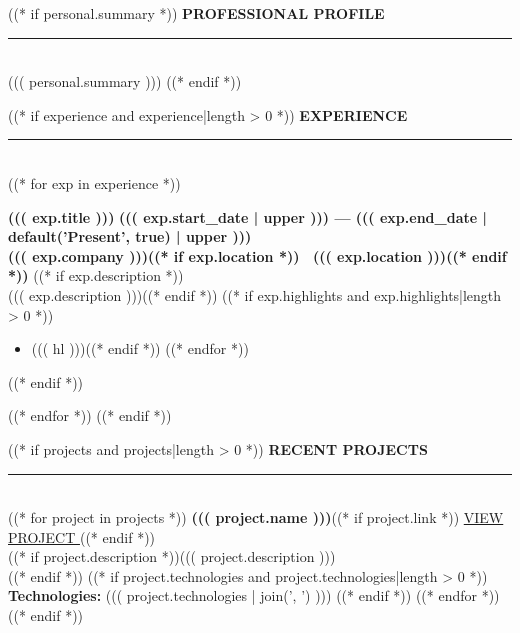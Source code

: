 \documentclass[11pt,a4paper]{article}
\begin{document}
\begin{minipage}[t]{0.62\textwidth}
\color{body}
\vspace{12mm}
\hspace{5mm}
\begin{minipage}[t]{0.88\textwidth}

((* if personal.summary *))
{\fontsize{12}{14}\selectfont\bfseries\color{black}\MakeUppercase{Professional Profile}}\\[2pt]
{\color{black}\rule{\linewidth}{1.5pt}}\\[8pt]
{\fontsize{9.5}{13.5}\selectfont ((( personal.summary )))}
\vspace{15pt}
((* endif *))

((* if experience and experience|length > 0 *))
{\fontsize{12}{14}\selectfont\bfseries\color{black}\MakeUppercase{Experience}}\\[2pt]
{\color{black}\rule{\linewidth}{1.5pt}}\\[10pt]
((* for exp in experience *))
\begin{minipage}{\linewidth}
{\fontsize{10}{12}\selectfont\bfseries ((( exp.title )))} \hfill {\scriptsize\color{muted}\bfseries ((( exp.start_date | upper ))) --- ((( exp.end_date | default('Present', true) | upper )))}\\[2pt]
{\fontsize{9}{11}\selectfont\color{gold}\bfseries ((( exp.company )))((* if exp.location *)) \textbar\ ((( exp.location )))((* endif *))}
((* if exp.description *))\\[4pt] {\fontsize{8.5}{11.5}\selectfont ((( exp.description )))}((* endif *))
((* if exp.highlights and exp.highlights|length > 0 *))
\begin{itemize}[leftmargin=12pt, itemsep=2pt, parsep=0pt, topsep=4pt]
((* for hl in exp.highlights *))((* if hl *))\item {\fontsize{8.5}{11.5}\selectfont ((( hl )))}((* endif *))
((* endfor *))
\end{itemize}
((* endif *))
\end{minipage}
\vspace{11pt}
((* endfor *))
((* endif *))

((* if projects and projects|length > 0 *))
{\fontsize{12}{14}\selectfont\bfseries\color{black}\MakeUppercase{Recent Projects}}\\[2pt]
{\color{black}\rule{\linewidth}{1.5pt}}\\[8pt]
((* for project in projects *))
{\fontsize{10}{12}\selectfont\bfseries ((( project.name )))}((* if project.link *)) \hfill {\scriptsize\href{((* if 'http' not in project.link *))https://((* endif *))((( project.link )))}{\color{gold}VIEW PROJECT \faExternalLinkAlt}}((* endif *))\\
((* if project.description *)){\fontsize{8.5}{11.5}\selectfont ((( project.description )))}\\((* endif *))
((* if project.technologies and project.technologies|length > 0 *))
{\fontsize{8}{10}\selectfont\color{muted}\textbf{Technologies:} ((( project.technologies | join(', ') )))}
((* endif *))
\vspace{8pt}
((* endfor *))
((* endif *))


\end{minipage}
\end{minipage}
\end{document}
